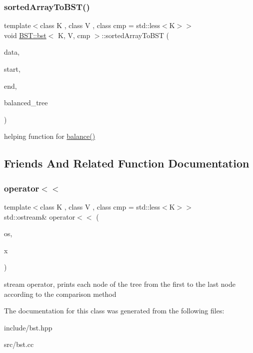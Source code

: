 \subsubsection{\texorpdfstring{sorted\+Array\+To\+B\+S\+T()}{sortedArrayToBST()}}
{\footnotesize\ttfamily template$<$class K , class V , class cmp  = std\+::less$<$\+K$>$$>$ \\
void \hyperlink{classBST_1_1bst}{B\+S\+T\+::bst}$<$ K, V, cmp $>$\+::sorted\+Array\+To\+B\+ST (\begin{DoxyParamCaption}\item[{std\+::vector$<$ pair\+\_\+type $>$}]{data,  }\item[{int}]{start,  }\item[{int}]{end,  }\item[{\hyperlink{classBST_1_1bst}{bst}$<$ K, V, cmp $>$ \&}]{balanced\+\_\+tree }\end{DoxyParamCaption})}

helping function for \hyperlink{classBST_1_1bst_af4df6a5c2ae79c5133688b3e117d622b}{balance()} 

\subsection{Friends And Related Function Documentation}
\mbox{\label{classBST_1_1bst_ae4b7d69364fca0855f74abdcad674ebf}} 
\subsubsection{\texorpdfstring{operator$<$$<$}{operator<<}}
{\footnotesize\ttfamily template$<$class K , class V , class cmp  = std\+::less$<$\+K$>$$>$ \\
std\+::ostream\& operator$<$$<$ (\begin{DoxyParamCaption}\item[{std\+::ostream \&}]{os,  }\item[{const \hyperlink{classBST_1_1bst}{bst}$<$ K, V, cmp $>$ \&}]{x }\end{DoxyParamCaption})\hspace{0.3cm}{\ttfamily [friend]}}

stream operator, prints each node of the tree from the first to the last node according to the comparison method 

The documentation for this class was generated from the following files\+:\begin{DoxyCompactItemize}
\item 
include/bst.\+hpp\item 
src/bst.\+cc\end{DoxyCompactItemize}
